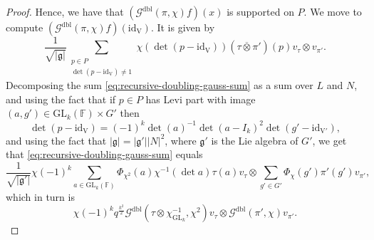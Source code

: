 \documentclass[12pt, reqno]{amsart}
\theoremstyle{definition}
\theoremstyle{definition}
\theoremstyle{definition}
\newcommand{\idmap}{\mathrm{id}}
\newcommand{\sizeof}[1]{\left|#1\right|}
\newcommand{\hermitianSpace}{\mathrm{V}}
\newcommand{\GL}{\mathrm{GL}}
\newcommand{\finiteField}{\mathbb{F}}
\newcommand{\dblGaussSum}[2]{\mathcal{G}^{\mathrm{dbl}}\left(#1, #2\right)}
\newcommand{\lieAlgebra}{\mathfrak{g}}
\begin{document}
\begin{proof}
	Hence, we have that $\left(\dblGaussSum{\pi}{\chi} f\right)\left(x\right)$ is supported on $P$. We move to compute $\left(\dblGaussSum{\pi}{\chi} f\right)\left(\idmap_{\hermitianSpace}\right)$. It is given by
	\begin{equation}\label{eq:recursive-doubling-gauss-sum}
		\frac{1}{\sqrt{\sizeof{\lieAlgebra}}} \sum_{\substack{p \in P\\
				\det\left(p - \idmap_{\hermitianSpace}\right) \ne 1}} \chi\left(\det\left(p - \idmap_{\hermitianSpace}\right)\right) \left(\tau \overline{\otimes} \pi'\right)\left(p\right) v_{\tau} \otimes v_{\pi'}.
	\end{equation}
	Decomposing the sum \eqref{eq:recursive-doubling-gauss-sum} as a sum over $L$ and $N$, and using the fact that if $p \in P$ has Levi part with image $\left(a, g'\right) \in \GL_k\left(\finiteField\right) \times G'$ then $$\det\left(p - \idmap_{\hermitianSpace}\right) = \left(-1\right)^k \det\left(a\right)^{-1}\det\left(a - I_k\right)^2 \det\left( g' - \idmap_{\hermitianSpace'}\right),$$
	and using the fact that $\sizeof{\lieAlgebra} = \sizeof{\lieAlgebra'} \sizeof{N}^2$, where $\lieAlgebra'$ is the Lie algebra of $G'$,
	we get that \eqref{eq:recursive-doubling-gauss-sum} equals
	\begin{equation}
		\frac{1}{\sqrt{\sizeof{\lieAlgebra'}}} \chi\left(-1\right)^k \sum_{a \in \GL_k\left(\finiteField\right)} \Phi_{\chi^2}\left(a\right) \chi^{-1}\left(\det a\right) \tau\left(a\right) v_{\tau} \otimes \sum_{g' \in G'} \Phi_{\chi}\left(g'\right) \pi'\left(g'\right) v_{\pi'},
	\end{equation}
	which in turn is
	$$\chi\left(-1\right)^k q^{\frac{k^2}{2}} \dblGaussSum{\tau \otimes \chi_{\GL_k}^{-1}}{\chi^2} v_{\tau} \otimes \dblGaussSum{\pi'}{\chi} v_{\pi'}.$$
\end{proof}



\end{document}
